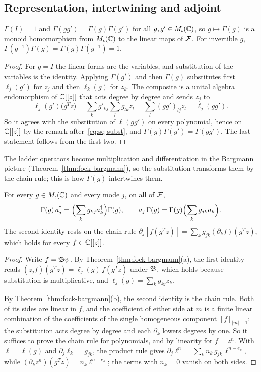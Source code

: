 \begin{vetdenv}
\subsection{Representation, intertwining and adjoint}

\begin{theorem}[Representation]\label{thm:sq-rep}
$\Gamma(I)=1$ and $\Gamma(gg')=\Gamma(g)\Gamma(g')$ for all $g,g'\in M_\iota(\mathbb C)$, so $g\mapsto\Gamma(g)$ is a monoid
homomorphism from $M_\iota(\mathbb C)$ to the linear maps of $\mathcal F$. For invertible $g$,
$\Gamma(g^{-1})\Gamma(g)=\Gamma(g)\Gamma(g^{-1})=1$.
\end{theorem}

\begin{proof}
For $g=I$ the linear forms are the variables, and substitution of the variables is the identity. Applying
$\Gamma(g')$ and then $\Gamma(g)$ substitutes first $\ell_j(g')$ for $z_j$ and then $\ell_k(g)$ for $z_k$. The
composite is a unital algebra endomorphism of $\mathbb C[[z]]$ that acts degree by degree and sends $z_j$ to
\[
 \ell_j(g')\bigl(g^Tz\bigr)=\sum_kg'_{kj}\sum_lg_{lk}z_l=\sum_l(gg')_{lj}z_l=\ell_j(gg').
\]
So it agrees with the substitution of $\ell(gg')$ on every polynomial, hence on $\mathbb C[[z]]$ by the remark
after~\eqref{eq:sq-subst}, and
$\Gamma(g)\Gamma(g')=\Gamma(gg')$. The last statement follows from the first two.
\end{proof}

The ladder operators become multiplication and differentiation in the Bargmann picture
(Theorem~\ref{thm:fock-bargmann}), so the substitution transforms them by the chain rule; this is how
$\Gamma(g)$ intertwines them.

\begin{theorem}[Intertwining]\label{thm:sq-intertwine}
For every $g\in M_\iota(\mathbb C)$ and every mode $j$, on all of $\mathcal F$,
\[
 \Gamma(g)\,a_j^\dagger=\Bigl(\sum_kg_{kj}a_k^\dagger\Bigr)\Gamma(g),\qquad
 a_j\,\Gamma(g)=\Gamma(g)\Bigl(\sum_kg_{jk}a_k\Bigr).
\]
The second identity rests on the chain rule $\partial_j[f(g^Tz)]=\sum_kg_{jk}(\partial_kf)(g^Tz)$, which holds for
every $f\in\mathbb C[[z]]$.
\end{theorem}

\begin{proof}
Write $f=\mathfrak B\psi$. By Theorem~\ref{thm:fock-bargmann}(a), the first identity reads $(z_jf)(g^Tz)=\ell_j(g)\,
f(g^Tz)$ under $\mathfrak B$, which holds because substitution is multiplicative, and $\ell_j(g)=\sum_kg_{kj}z_k$.

By Theorem~\ref{thm:fock-bargmann}(b), the second identity is the chain rule. Both of its sides are linear in
$f$, and the coefficient of either side at $m$ is a finite linear combination of the coefficients of the single
homogeneous component $[f]_{\lvert m\rvert+1}$: the substitution acts degree by degree and each $\partial_k$ lowers
degrees by one. So it suffices to prove the chain rule for polynomials, and by linearity for
$f=z^n$. With $\ell=\ell(g)$ and $\partial_j\ell_k=g_{jk}$, the product rule gives
$\partial_j\ell^n=\sum_kn_k\,g_{jk}\,\ell^{n-e_k}$, while $(\partial_kz^n)(g^Tz)=n_k\ell^{n-e_k}$; the terms with
$n_k=0$ vanish on both sides.
\end{proof}


\end{vetdenv}
